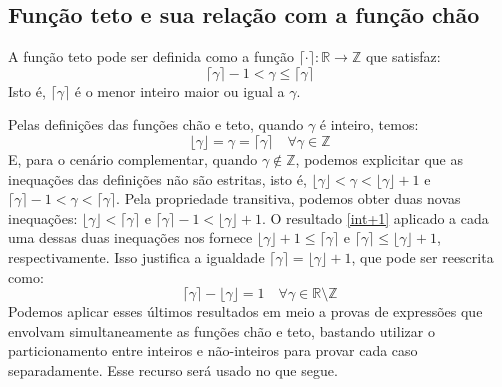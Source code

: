 \subsection*{Função teto e sua relação com a função chão}

A função teto pode ser definida
como a função $\lceil \cdot \rceil : \mathds{R} \to \mathds{Z}$
que satisfaz:
\begin{equation}\tag{Teto}
  \lceil \gamma \rceil - 1 < \gamma \le \lceil \gamma \rceil
\end{equation}
Isto é,
$\lceil \gamma \rceil$ é o menor inteiro maior ou igual a $\gamma$.

Pelas definições das funções chão e teto,
quando $\gamma$ é inteiro, temos:
\[
  \lfloor \gamma \rfloor = \gamma = \lceil \gamma \rceil
  \quad \forall \gamma \in \mathds{Z}
\]
E, para o cenário complementar, quando $\gamma \notin \mathds{Z}$,
podemos explicitar que as inequações das definições não são estritas,
isto é, $\lfloor \gamma \rfloor < \gamma < \lfloor \gamma \rfloor + 1$
e $\lceil \gamma \rceil - 1 < \gamma < \lceil \gamma \rceil$.
Pela propriedade transitiva, podemos obter duas novas inequações:
$\lfloor \gamma \rfloor < \lceil \gamma \rceil$
e $\lceil \gamma \rceil - 1 < \lfloor \gamma \rfloor + 1$.
O resultado \eqref{int+1}
aplicado a cada uma dessas duas inequações nos fornece
$\lfloor \gamma \rfloor + 1 \le \lceil \gamma \rceil$ e
$\lceil \gamma \rceil \le \lfloor \gamma \rfloor + 1$, respectivamente.
Isso justifica a igualdade
$\lceil \gamma \rceil = \lfloor \gamma \rfloor + 1$,
que pode ser reescrita como:
\[
  \lceil \gamma \rceil - \lfloor \gamma \rfloor = 1
  \quad \forall \gamma \in \mathds{R} \setminus \mathds{Z}
\]
Podemos aplicar esses últimos resultados
em meio a provas de expressões
que envolvam  simultaneamente as funções chão e teto,
bastando utilizar o particionamento entre inteiros e não-inteiros
para provar cada caso separadamente.
Esse recurso será usado no que segue.

